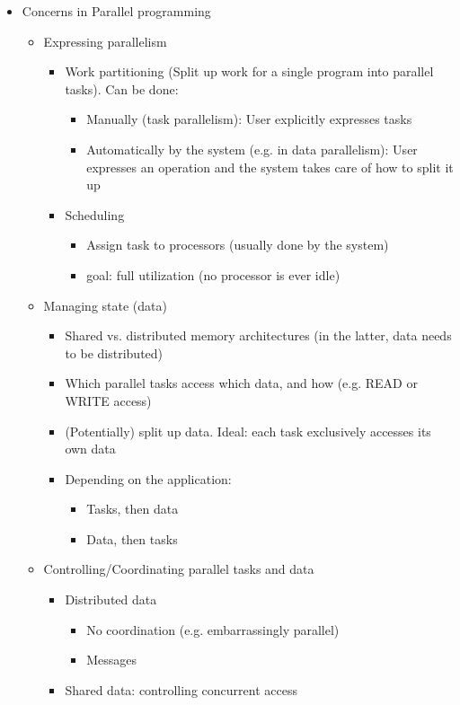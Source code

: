 \documentclass[a4paper]{article}
\begin{document}
\begin{itemize}
\item Concerns in Parallel programming
\begin{itemize}
\item Expressing parallelism
\begin{itemize}
\item Work partitioning (Split up work for a single program into parallel tasks). Can be done:
\begin{itemize}
\item Manually (task parallelism): User explicitly expresses tasks
\item Automatically by the system (e.g. in data parallelism): User expresses an operation and the system takes care of how to split it up 
\end{itemize}
\item Scheduling
\begin{itemize}
\item Assign task to processors (usually done by the system)
\item goal: full utilization (no processor is ever idle)
\end{itemize}
\end{itemize}
\item Managing state (data)
\begin{itemize}
\item Shared vs. distributed memory architectures (in the latter, data needs to be distributed)
\item Which parallel tasks access which data, and how (e.g. READ or WRITE access)
\item (Potentially) split up data. Ideal: each task exclusively accesses its own data
\item Depending on the application:
\begin{itemize}
\item Tasks, then data
\item Data, then tasks
\end{itemize}
\end{itemize}
\item Controlling/Coordinating parallel tasks and data
\begin{itemize}
\item Distributed data
\begin{itemize}
\item No coordination (e.g. embarrassingly parallel)
\item Messages
\end{itemize}
\item Shared data: controlling concurrent access

\end{itemize}
\end{itemize}
\end{itemize}
\end{document}
